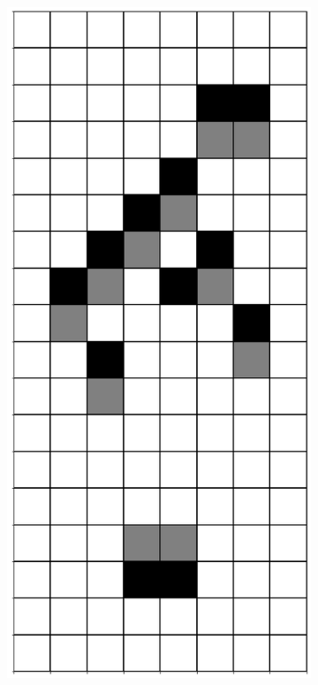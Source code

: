 \documentclass[12pt]{article}
\numberwithin{figure}{section} %
\begin{document}
\begin{figure}[H]
\begin{subfigure}{0.19\textwidth}
     		\subcaption{}
   	\end{subfigure}
        	\begin{subfigure}{0.19\textwidth}
     		\centering
     		\includegraphics[width=\linewidth]{Section4/27.3}

\end{subfigure}
\end{figure}
\end{document}
